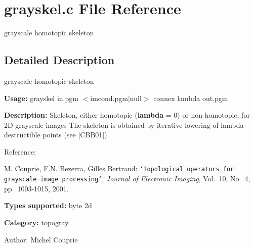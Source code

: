 \section{grayskel.c File Reference}
\label{grayskel_8c}
grayscale homotopic skeleton 



\subsection{Detailed Description}
grayscale homotopic skeleton 

{\bf Usage:} grayskel in.pgm $<$imcond.pgm$|$null$>$ connex lambda out.pgm

{\bf Description:} Skeleton, either homotopic ({\bf lambda} = 0) or non-homotopic, for 2D grayscale images The skeleton is obtained by iterative lowering of lambda-destructible points (see [CBB01]).

Reference:\par
 [CBB01] M. Couprie, F.N. Bezerra, Gilles Bertrand: {\tt \char`\"{}Topological operators for grayscale image processing\char`\"{}}, {\em  Journal of Electronic Imaging\/}, Vol.~10, No.~4, pp.~1003-1015, 2001.

{\bf Types supported:} byte 2d

{\bf Category:} topogray

\begin{Desc}
\item[Author:]Michel Couprie \end{Desc}
